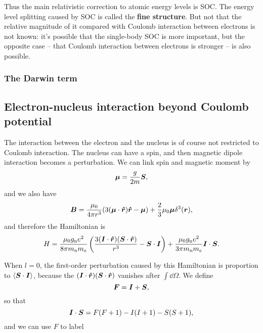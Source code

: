 \documentclass[hyperref, a4paper]{article}
\newcommand*{\concept}[1]{{\textbf{#1}}}
\begin{document}
Thus the main relativistic correction to atomic energy levels is SOC. 
The energy level splitting caused by SOC 
is called the \concept{fine structure}.
But not that the relative magnitude of it compared 
with Coulomb interaction between electrons 
is not known:
it's possible that the single-body SOC is more important,
but the opposite case -- that Coulomb interaction between electrons is stronger 
-- is also possible.

\subsubsection{The Darwin term}



\subsection{Electron-nucleus interaction beyond Coulomb potential}

The interaction between the electron and the nucleus 
is of course not restricted to Coulomb interaction.
The nucleus can have a spin, 
and then magnetic dipole interaction becomes a perturbation.
We can link spin and magnetic moment by 
\begin{equation}
    \vb*{\mu} = \frac{g}{2m} \vb*{S},
\end{equation}
and we also have 
\begin{equation}
    \vb*{B} = \frac{\mu_0}{4 \pi r^3} (3 (\vb*{\mu} \cdot \vu*{r}) \vu*{r} - \vb*{\mu})
    + \frac{2}{3} \mu_0 \vb*{\mu} \delta^3(\vb*{r}),
\end{equation}
and therefore the Hamiltonian is 
\begin{equation}
    H = \frac{\mu_0 g_{\text{n}} e^2}{8 \pi m_{\text{n}} m_e} 
    \left(
        \frac{3 (\vb*{I} \cdot \vu*{r}) (\vb*{S} \cdot \vu*{r})}{r^3}
        - \vb*{S} \cdot \vb*{I}
    \right)
    + \frac{\mu_0 g_{\text{n}} e^2}{3 \pi m_{\text{n}} m_e} \vb*{I} \cdot \vb*{S}.
\end{equation}

When $l = 0$, the first-order perturbation caused by this Hamiltonian 
is proportion to $\expval{\vb*{S} \cdot \vb*{I}}$,
because the $(\vb*{I} \cdot \vu*{r}) (\vb*{S} \cdot \vu*{r})$
vanishes after $\int \dd{\Omega}$.
We define 
\begin{equation}
    \vb*{F} = \vb*{I} + \vb*{S},
\end{equation}
so that 
\begin{equation}
    \vb*{I} \cdot \vb*{S} = F(F+1) - I(I+1) - S(S+1),
\end{equation}
and we can use $F$ to label 
\end{document}
